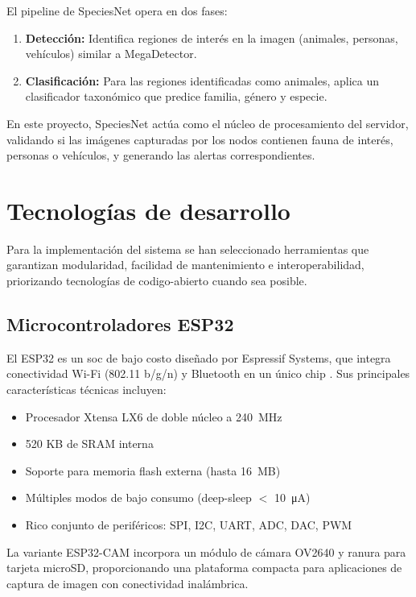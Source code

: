 \documentclass[a4paper, 12pt]{report}
\begin{document}
El pipeline de SpeciesNet opera en dos fases:
\begin{enumerate}
  \item \textbf{Detección:} Identifica regiones de interés en la imagen
    (animales, personas, vehículos) similar a MegaDetector.
  \item \textbf{Clasificación:} Para las regiones identificadas como animales,
    aplica un clasificador taxonómico que predice familia, género y
    especie.
\end{enumerate}

En este proyecto, SpeciesNet actúa como el núcleo de procesamiento del
servidor, validando si las imágenes capturadas por los nodos contienen
fauna de interés, personas o vehículos, y generando las alertas correspondientes.

\section{Tecnologías de desarrollo}

Para la implementación del sistema se han seleccionado herramientas que
garantizan modularidad, facilidad de mantenimiento e interoperabilidad,
priorizando tecnologías de \gls{codigo-abierto} cuando sea posible.

\subsection{Microcontroladores ESP32}

El \gls{ESP32} es un \gls{soc} de bajo costo diseñado por Espressif Systems,
que integra conectividad Wi-Fi (802.11 b/g/n) y Bluetooth en un único chip
\cite{espressif2023esp32}. Sus principales características técnicas incluyen:

\begin{itemize}
  \item Procesador Xtensa LX6 de doble núcleo a \qty{240}{MHz}
  \item \num{520} KB de SRAM interna
  \item Soporte para memoria flash externa (hasta \qty{16}{MB})
  \item Múltiples modos de bajo consumo (\gls{deep-sleep} $<$ \qty{10}{\uA})
  \item Rico conjunto de periféricos: SPI, I2C, UART, ADC, DAC, PWM
\end{itemize}

La variante ESP32-CAM incorpora un módulo de cámara OV2640 y ranura para
tarjeta microSD, proporcionando una plataforma compacta para aplicaciones
de captura de imagen con conectividad inalámbrica.
\end{document}
